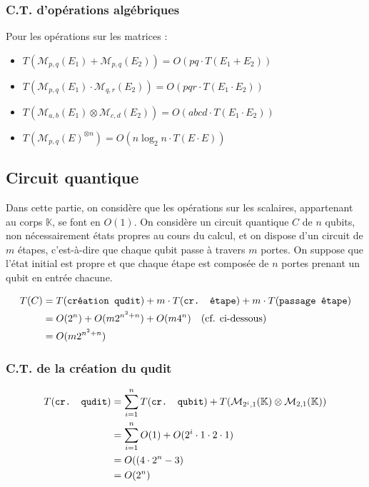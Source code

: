 \documentclass[french]{article}
\newcommand{\somme}{\displaystyle\sum}
\newcommand{\mat}[3]{\mathcal{M}_{#1,#2} (#3)}
\newcommand{\corps}{\mathbb{K}}
\newcommand{\mc}[1]{\text{\texttt{#1}}}
\newcommand\danger[1][2.7ex]{%
    \renewcommand\stacktype{L}%
    \scaleto{\stackon[1.3pt]{\color{red}$\triangle$}{\tiny !}}{#1}%
}
\begin{document}
\subsubsection{C.T. d'opérations algébriques}


\noindent Pour les opérations sur les matrices :
\begin{itemize}
    \item $T(\mat{p}{q}{E_1} + \mat{p}{q}{E_2}) = O(pq \cdot T(E_1 + E_2))$
    \item $T(\mat{p}{q}{E_1} \cdot \mat{q}{r}{E_2}) = O(pqr \cdot T(E_1 \cdot E_2))$ \danger
    \item $T(\mat{a}{b}{E_1} \otimes \mat{c}{d}{E_2}) = O(abcd \cdot T(E_1 \cdot E_2))$ \danger
    \item $T(\mat{p}{q}{E}^{\otimes n}) = O(n \log_2 n \cdot T(E \cdot E))$
\end{itemize}

\subsection{Circuit quantique}

Dans cette partie, on considère que les opérations sur les scalaires, appartenant au corps $\corps$, se font en $O(1)$. On considère un circuit quantique $C$ de $n$ qubits, non nécessairement états propres au cours du calcul, et on dispose d'un circuit de $m$ étapes, c'est-à-dire que chaque qubit passe à travers $m$ portes. On suppose que l'état initial est propre et que chaque étape est composée de $n$ portes prenant un qubit en entrée chacune.


\begin{align*}
T(C)
&= T(\mc{création qudit}) + m \cdot T(\mc{cr. étape}) + m \cdot T(\mc{passage étape}) \\
&= O(2^n) + O(m2^{n^2 + n}) + O(m4^n) \quad \text{(cf. ci-dessous)} \\
&= O(m2^{n^2 + n})
\end{align*}


\subsubsection{C.T. de la création du qudit}

\begin{align*}
    T(\mc{cr. qudit})
&= \somme^{n}_{i=1} T(\mc{cr. qubit}) + T(\mat{2^i}{1}{\corps} \otimes \mat{2}{1}{\corps}) \\
&= \somme^{n}_{i=1} O(1) + O(2^i \cdot 1 \cdot 2 \cdot 1) \\
&= O((4 \cdot 2^n - 3) \\
&= O(2^n)
\end{align*}
\end{document}

